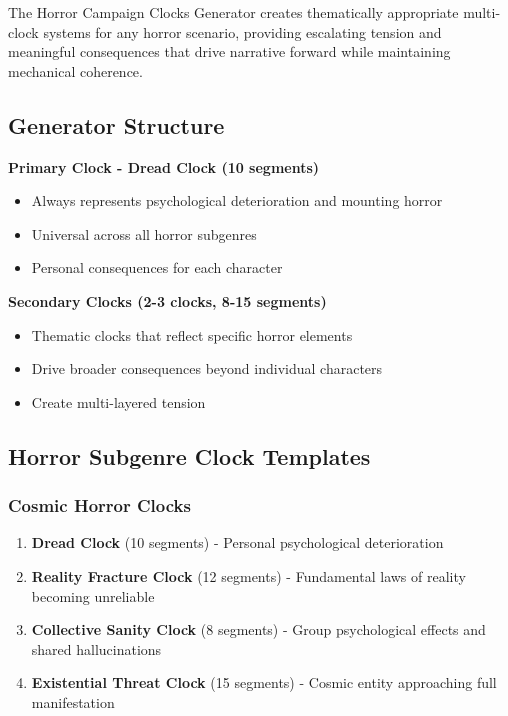 \documentclass[11pt]{article}
\begin{document}
The Horror Campaign Clocks Generator creates thematically appropriate multi-clock systems for any horror scenario, providing escalating tension and meaningful consequences that drive narrative forward while maintaining mechanical coherence.

\subsection{Generator Structure}

\textbf{Primary Clock - Dread Clock (10 segments)}
\begin{itemize}
\item Always represents psychological deterioration and mounting horror
\item Universal across all horror subgenres
\item Personal consequences for each character
\end{itemize}

\textbf{Secondary Clocks (2-3 clocks, 8-15 segments)}
\begin{itemize}
\item Thematic clocks that reflect specific horror elements
\item Drive broader consequences beyond individual characters
\item Create multi-layered tension
\end{itemize}

\subsection{Horror Subgenre Clock Templates}

\subsubsection{Cosmic Horror Clocks}
\begin{enumerate}
\item \textbf{Dread Clock} (10 segments) - Personal psychological deterioration
\item \textbf{Reality Fracture Clock} (12 segments) - Fundamental laws of reality becoming unreliable
\item \textbf{Collective Sanity Clock} (8 segments) - Group psychological effects and shared hallucinations
\item \textbf{Existential Threat Clock} (15 segments) - Cosmic entity approaching full manifestation
\end{enumerate}
\end{document}
